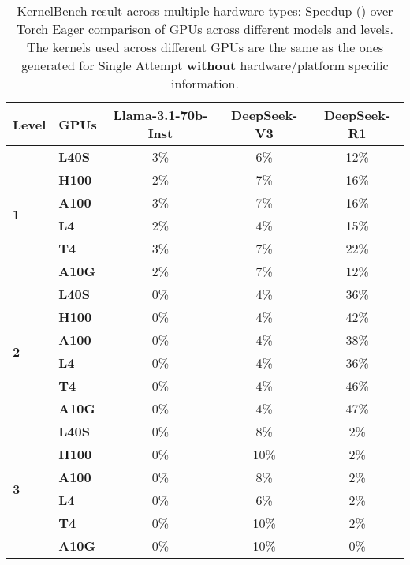 \begin{table}[H]
\centering
\begin{tabular}{llccc}
\toprule
\textbf{Level} & \textbf{GPUs} & \textbf{Llama-3.1-70b-Inst} & \textbf{DeepSeek-V3} & \textbf{DeepSeek-R1} \\
\midrule
\multirow{6}{*}{
\textbf{1}}
 & \textbf{L40S} & 3\% & 6\% & 12\% \\
 & \textbf{H100} & 2\% & 7\% & 16\% \\
 & \textbf{A100} & 3\% & 7\% & 16\%\\
 & \textbf{L4} & 2\% & 4\% & 15\% \\
 & \textbf{T4} & 3\% & 7\% & 22\% \\
 & \textbf{A10G} & 2\% & 7\% & 12\% \\
\midrule
\multirow{6}{*}{\textbf{2}}
 & \textbf{L40S} & 0\% & 4\% & 36\% \\
 & \textbf{H100} & 0\% & 4\% & 42\%\\
 & \textbf{A100} & 0\% & 4\% & 38\%\\
 & \textbf{L4} & 0\% & 4\% & 36\% \\
 & \textbf{T4} & 0\% & 4\% & 46\% \\
 & \textbf{A10G} & 0\% & 4\% & 47\% \\
\midrule
\multirow{6}{*}{\textbf{3}}
 & \textbf{L40S} & 0\% & 8\% & 2\% \\
 & \textbf{H100} & 0\% & 10\% & 2\% \\
 & \textbf{A100} & 0\% & 8\% & 2\% \\
 & \textbf{L4} & 0\% & 6\% & 2\% \\
 & \textbf{T4} & 0\% & 10\% & 2\% \\
 & \textbf{A10G} & 0\% & 10\% & 0\% \\
\bottomrule
\end{tabular}
\caption{KernelBench result across multiple hardware types: Speedup () over Torch Eager comparison of GPUs across different models and levels. The kernels used across different GPUs are the same as the ones generated for Single Attempt \textbf{without} hardware/platform specific information.}
\label{tab:speedup-hardware-comparison}
\end{table}